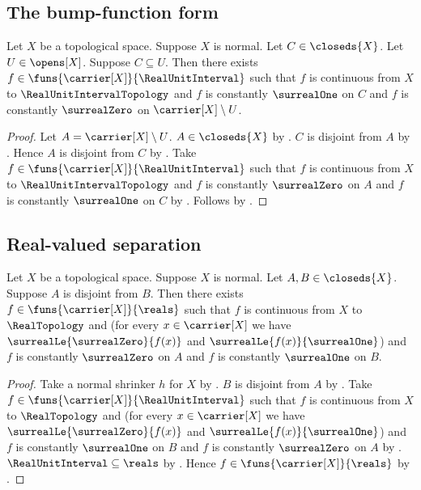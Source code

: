 \subsection{The bump-function form}

\begin{corollary}\label{urysohn_bump_function}
    Let $X$ be a topological space.
    Suppose $X$ is normal.
    Let $C\in\closeds{X}$.
    Let $U\in\opens[X]$.
    Suppose $C\subseteq U$.
    Then there exists $f\in\funs{\carrier[X]}{\RealUnitInterval}$
        such that $f$ is continuous from $X$ to
        $\RealUnitIntervalTopology$ and
        $f$ is constantly $\surrealOne$ on $C$ and
        $f$ is constantly $\surrealZero$ on $\carrier[X]\setminus U$.
\end{corollary}
\begin{proof}
    Let $A=\carrier[X]\setminus U$.
    $A\in\closeds{X}$ by .
    $C$ is disjoint from $A$
        by .
    Hence $A$ is disjoint from $C$ by .
    Take $f\in\funs{\carrier[X]}{\RealUnitInterval}$ such that
        $f$ is continuous from $X$ to $\RealUnitIntervalTopology$ and
        $f$ is constantly $\surrealZero$ on $A$ and
        $f$ is constantly $\surrealOne$ on $C$
        by .
    Follows by \auto.
\end{proof}

\subsection{Real-valued separation}

\begin{theorem}\label{urysohn_lemma_real}
    Let $X$ be a topological space.
    Suppose $X$ is normal.
    Let $A,B\in\closeds{X}$.
    Suppose $A$ is disjoint from $B$.
    Then there exists $f\in\funs{\carrier[X]}{\reals}$
        such that $f$ is continuous from $X$ to $\RealTopology$ and
        (for every $x\in\carrier[X]$ we have
            $\surrealLe{\surrealZero}{f(x)}$ and
            $\surrealLe{f(x)}{\surrealOne}$) and
        $f$ is constantly $\surrealZero$ on $A$ and
        $f$ is constantly $\surrealOne$ on $B$.
\end{theorem}
\begin{proof}
    Take a normal shrinker $h$ for $X$
        by .
    $B$ is disjoint from $A$ by .
    Take $f\in\funs{\carrier[X]}{\RealUnitInterval}$ such that
        $f$ is continuous from $X$ to $\RealTopology$ and
        (for every $x\in\carrier[X]$ we have
            $\surrealLe{\surrealZero}{f(x)}$ and
            $\surrealLe{f(x)}{\surrealOne}$) and
        $f$ is constantly $\surrealOne$ on $B$ and
        $f$ is constantly $\surrealZero$ on $A$
        by .
    $\RealUnitInterval\subseteq\reals$
        by .
    Hence $f\in\funs{\carrier[X]}{\reals}$
        by .
\end{proof}
